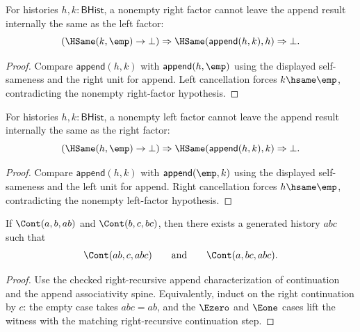 \begin{theorem}
\label{thm:append-right-nonempty-self-absurd}
For histories $h,k:\mathsf{BHist}$, a nonempty right factor cannot leave the
append result internally the same as the left factor:
$$
(\HSame(k,\emp)\to\bot)\Rightarrow
\HSame(\mathsf{append}(h,k),h)\Rightarrow\bot.
$$
\end{theorem}
\begin{proof}
Compare $\mathsf{append}(h,k)$ with $\mathsf{append}(h,\emp)$ using the
displayed self-sameness and the right unit for append. Left cancellation
forces $k\hsame\emp$, contradicting the nonempty right-factor hypothesis.
\end{proof}

\begin{theorem}
\label{thm:append-left-nonempty-self-absurd}
For histories $h,k:\mathsf{BHist}$, a nonempty left factor cannot leave the
append result internally the same as the right factor:
$$
(\HSame(h,\emp)\to\bot)\Rightarrow
\HSame(\mathsf{append}(h,k),k)\Rightarrow\bot.
$$
\end{theorem}
\begin{proof}
Compare $\mathsf{append}(h,k)$ with $\mathsf{append}(\emp,k)$ using the
displayed self-sameness and the left unit for append. Right cancellation
forces $h\hsame\emp$, contradicting the nonempty left-factor hypothesis.
\end{proof}

\begin{theorem}
If $\Cont(a,b,ab)$ and $\Cont(b,c,bc)$, then there exists a generated history $abc$ such that
$$
\Cont(ab,c,abc)
\qquad\text{and}\qquad
\Cont(a,bc,abc).
$$
\end{theorem}
\begin{proof}
Use the checked right-recursive append characterization of continuation and the append associativity spine.  Equivalently, induct on the right continuation by $c$: the empty case takes $abc=ab$, and the $\Ezero$ and $\Eone$ cases lift the witness with the matching right-recursive continuation step.
\end{proof}

